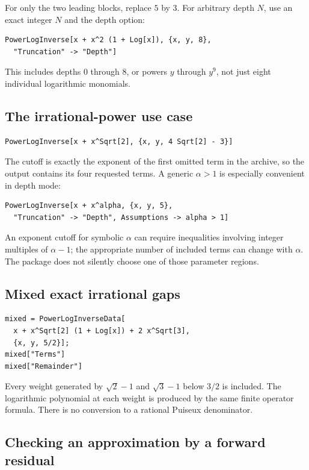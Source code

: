 \documentclass[11pt,a4paper]{article}
\theoremstyle{definition}
\theoremstyle{remark}
\begin{document}
For only the two leading blocks, replace $5$ by $3$. For arbitrary depth $N$,
use an exact integer $N$ and the depth option:
\begin{lstlisting}
PowerLogInverse[x + x^2 (1 + Log[x]), {x, y, 8},
  "Truncation" -> "Depth"]
\end{lstlisting}
This includes depths $0$ through $8$, or powers $y$ through $y^9$, not just
eight individual logarithmic monomials.

\subsection{The irrational-power use case}

\begin{lstlisting}
PowerLogInverse[x + x^Sqrt[2], {x, y, 4 Sqrt[2] - 3}]
\end{lstlisting}
The cutoff is exactly the exponent of the first omitted term in the archive,
so the output contains its four requested terms. A generic $\alpha>1$ is
especially convenient in depth mode:
\begin{lstlisting}
PowerLogInverse[x + x^alpha, {x, y, 5},
  "Truncation" -> "Depth", Assumptions -> alpha > 1]
\end{lstlisting}
An exponent cutoff for symbolic $\alpha$ can require inequalities involving
integer multiples of $\alpha-1$; the appropriate number of included terms can
change with $\alpha$. The package does not silently choose one of those
parameter regions.

\subsection{Mixed exact irrational gaps}

\begin{lstlisting}
mixed = PowerLogInverseData[
  x + x^Sqrt[2] (1 + Log[x]) + 2 x^Sqrt[3],
  {x, y, 5/2}];
mixed["Terms"]
mixed["Remainder"]
\end{lstlisting}
Every weight generated by $\sqrt2-1$ and $\sqrt3-1$ below $3/2$ is included.
The logarithmic polynomial at each weight is produced by the same finite
operator formula. There is no conversion to a rational Puiseux denominator.

\subsection{Checking an approximation by a forward residual}
\end{document}
